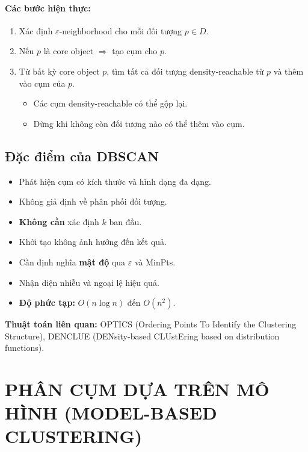 \documentclass[10pt]{article}
\begin{document}
\paragraph{Các bước hiện thực:}
\begin{enumerate}
    \item Xác định $\varepsilon$-neighborhood cho mỗi đối tượng $p \in D$.
    \item Nếu $p$ là core object $\Rightarrow$ tạo cụm cho $p$.
    \item Từ bất kỳ core object $p$, tìm tất cả đối tượng density-reachable từ $p$ và thêm vào cụm của $p$.
    \begin{itemize}
        \item Các cụm density-reachable có thể gộp lại.
        \item Dừng khi không còn đối tượng nào có thể thêm vào cụm.
    \end{itemize}
\end{enumerate}

\subsection{Đặc điểm của DBSCAN}

\begin{itemize}
    \item Phát hiện cụm có kích thước và hình dạng đa dạng.
    \item Không giả định về phân phối đối tượng.
    \item \textbf{Không cần} xác định $k$ ban đầu.
    \item Khởi tạo không ảnh hưởng đến kết quả.
    \item Cần định nghĩa \textbf{mật độ} qua $\varepsilon$ và MinPts.
    \item Nhận diện nhiễu và ngoại lệ hiệu quả.
    \item \textbf{Độ phức tạp:} $O(n \log n)$ đến $O(n^2)$.
\end{itemize}

\textbf{Thuật toán liên quan:} OPTICS (Ordering Points To Identify the Clustering Structure), DENCLUE (DENsity-based CLUstEring based on distribution functions).

\section{PHÂN CỤM DỰA TRÊN MÔ HÌNH (MODEL-BASED CLUSTERING)}
\end{document}
